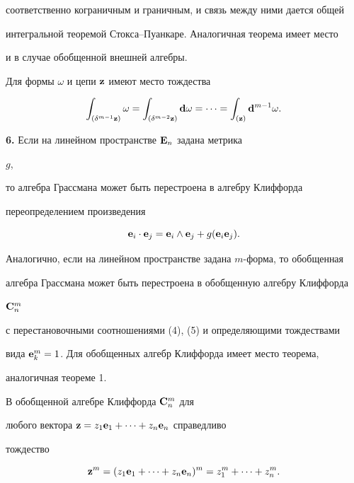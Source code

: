 соответственно кограничным и граничным, и связь между ними дается общей


интегральной теоремой Стокса--Пуанкаре. Аналогичная теорема имеет место


и в случае обобщенной внешней алгебры.





\begin{thm}


Для формы $\omega$ и цепи ${\bold z}$ имеют место тождества


$$


\int_{(\delta^{m-1} {\bold z})} \omega = \int_{(\delta^{m-2} {\bold z})}


{\bold d}\omega= \dotsb = \int_{(\bold z)} {\bold d}^{m-1} \omega.


$$


\end{thm}





{\bf 6.} Если на линейном пространстве ${\bold E}_n$ задана метрика


$g$,


то алгебра Грассмана может быть перестроена в алгебру Клиффорда


переопределением произведения


$$


{\bold e}_i\cdot {\bold e}_j= {\bold e}_i\wedge {\bold e}_j+ g({\bold e}_i


{\bold e}_j).


$$


Аналогично, если на линейном пространстве задана $m$-форма, то обобщенная


алгебра Грассмана может быть перестроена в обобщенную алгебру Клиффорда


${\bold C}_n^m$


с перестановочными соотношениями (4), (5) и определяющими тождествами


вида ${\bold e}_k^m=1$. Для обобщенных алгебр Клиффорда имеет место теорема,


аналогичная теореме 1.





\begin{thm}


В обобщенной алгебре Клиффорда ${\bold C}_n^m $ для


любого вектора ${\bold z}=z_1{\bold e}_1+\dotsb+z_n{\bold e}_n$ справедливо


тождество


$$


{\bold z}^m= (z_1{\bold e}_1+\dotsb +z_n{\bold e}_n)^m=z_1^m+\dotsb+z^m_n.


$$


\end{thm}





